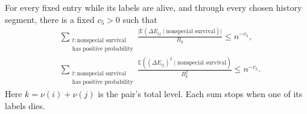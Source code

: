 \begin{lemma}
\label{lem:cleanup-entry-budgets}
For every fixed entry while its labels are alive, and through
every chosen history segment, there is a fixed $c_5>0$ such that
\begin{equation}
\begin{split}
 &\sum_{\substack{t:\text{nonspecial survival}\\
                         \text{has positive probability}}}
 \frac{\bigl|\mathbb E(\Delta E_{ij}\mid
                           \text{nonspecial survival})\bigr|}{B_k}
       \leq n^{-c_5},\\
 &\sum_{\substack{t:\text{nonspecial survival}\\
                         \text{has positive probability}}}
 \frac{\mathbb E((\Delta E_{ij})^2\mid
                           \text{nonspecial survival})}{B_k^2}
       \leq n^{-c_5}.
\end{split}
\label{eq:original-39}
\end{equation}
Here $k=\nu(i)+\nu(j)$ is the pair's total level.  Each sum stops when
one of its labels dies.
\end{lemma}

